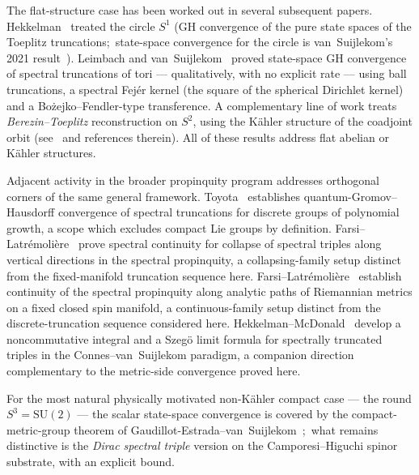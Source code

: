 \documentclass[11pt,a4paper]{article}
\theoremstyle{plain}
\theoremstyle{definition}
\newcommand{\sthree}{S^{3}}
\newcommand{\SU}{\mathrm{SU}}
\begin{document}
The flat-structure case has been worked out in several subsequent
papers. Hekkelman~\cite{hekkelman2022} treated the circle $S^1$
(GH convergence of the pure state spaces of the Toeplitz truncations;\
state-space convergence for the circle is van~Suijlekom's
2021 result~\cite{vs2021_jgp}). Leimbach and
van~Suijlekom~\cite{leimbach_vs2024}
proved state-space GH convergence of spectral truncations of tori ---
qualitatively, with no explicit rate --- using ball truncations, a
spectral Fej\'er kernel (the square of the spherical Dirichlet kernel)
and a Bo\.zejko--Fendler-type transference. A complementary line of work treats
\emph{Berezin--Toeplitz} reconstruction on $S^2$, using the K\"ahler
structure of the coadjoint orbit (see~\cite{ucp_maps_2024} and
references therein). All of these results address flat
abelian or K\"ahler structures.

Adjacent activity in the broader propinquity program addresses
orthogonal corners of the same general framework.
Toyota~\cite{toyota2023} establishes quantum-Gromov--Hausdorff
convergence of spectral truncations for discrete groups of
polynomial growth, a scope which excludes compact Lie groups by
definition. Farsi--Latr\'emoli\`ere~\cite{farsi_latremoliere2024}
prove spectral continuity for collapse of spectral triples along
vertical directions in the spectral propinquity, a
collapsing-family setup distinct from the fixed-manifold truncation
sequence here.
Farsi--Latr\'emoli\`ere~\cite{farsi_latremoliere2025} establish
continuity of the spectral propinquity along analytic paths of
Riemannian metrics on a fixed closed spin manifold, a
continuous-family setup distinct from the discrete-truncation
sequence considered here. Hekkelman--McDonald~\cite{hekkelman_mcdonald2024b}
develop a noncommutative integral and a Szeg\"o limit formula for
spectrally truncated triples in the Connes--van~Suijlekom paradigm,
a companion direction complementary to the metric-side convergence
proved here.

For the most natural physically motivated non-K\"ahler compact case
--- the round $\sthree = \SU(2)$ --- the scalar state-space
convergence is covered by the compact-metric-group theorem of
Gaudillot-Estrada--van~Suijlekom~\cite{gaudillot_vs2025};\ what
remains distinctive is the \emph{Dirac spectral triple} version on
the Camporesi--Higuchi spinor substrate, with an explicit bound.
\end{document}
